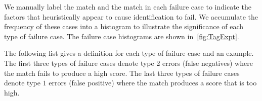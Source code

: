         We manually label the \groundtrue{} match and the
          \groundfalse{} match in each failure case to indicate the
          factors that heuristically appear to cause identification to
          fail.
        We accumulate the frequency of these cases into a histogram to
          illustrate the significance of each type of failure case.
        The failure case histograms are shown in~\cref{fig:TagExpt}.

        \TagExpt{}

        The following list gives a definition for each type of failure
          case and an example.
        The first three types of failure cases denote type 2 errors
          (false negatives) where the \groundtrue{} match fails to
          produce a high score.
        The last three types of failure cases denote type $1$ errors
          (false positive) where the \groundfalse{} match produces a
          score that is too high.

